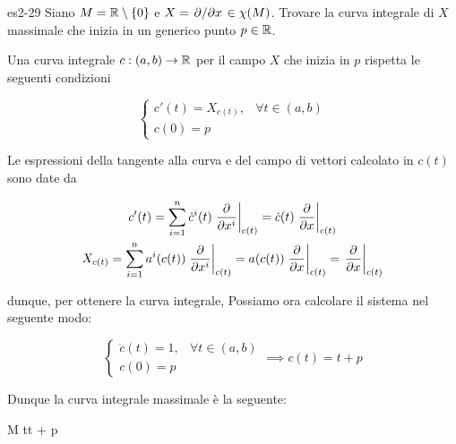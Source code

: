 
{es2-29}
{
Siano $ M = \mathbb{R} \setminus \{0\} $ e $ X = \pdv*{x} \in \chi(M) $. Trovare la curva integrale di $ X $ massimale che inizia in un generico punto $ p \in \mathbb{R} $.
}
{
Una curva integrale $ c : (a,b) \to \mathbb{R} $ per il campo $ X $ che inizia in $ p $ rispetta le seguenti condizioni

\begin{equation}
	\begin{cases}
		c'(t) = X_{c(t)}, & \forall t \in (a,b) \\
		c(0) = p
	\end{cases}
\end{equation}

Le espressioni della tangente alla curva e del campo di vettori calcolato in $ c(t) $ sono date da

\begin{gather}
	c'(t) = \sum_{i=1}^{n} \dot{c}^{i}(t) \eval{ \pdv{x^{i}} }_{c(t)} = \dot{c}(t) \eval{ \pdv{x} }_{c(t)} \\
	X_{c(t)} = \sum_{i=1}^{n} a^{i}(c(t)) \eval{ \pdv{x^{i}} }_{c(t)} = a(c(t)) \eval{ \pdv{x} }_{c(t)} = \eval{ \pdv{x} }_{c(t)}
\end{gather}

dunque, per ottenere la curva integrale, Possiamo ora calcolare il sistema nel seguente modo:

\begin{equation}
	\begin{cases}
		\dot{c}(t) = 1, & \forall t \in (a,b) \\
		c(0) = p
	\end{cases} %
	\implies %
	c(t) = t + p
\end{equation}

Dunque la curva integrale massimale è la seguente:

	{\R}{M}
	{t}{t + p}
}


